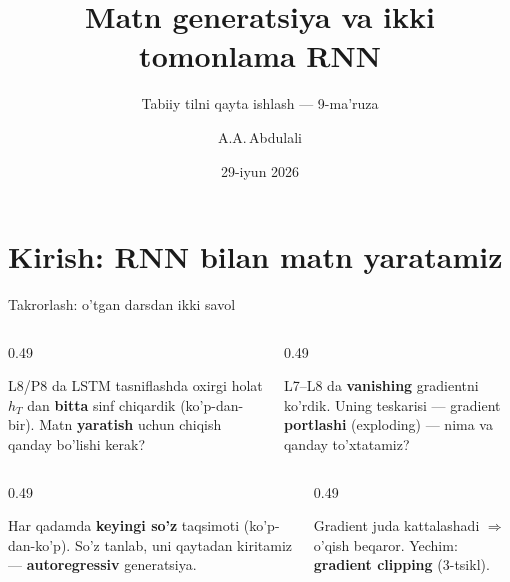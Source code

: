 \documentclass[aspectratio=169,11pt]{beamer}
\title[Generatsiya va Bi-RNN]{Matn generatsiya va ikki tomonlama RNN}
\subtitle{Tabiiy tilni qayta ishlash --- 9-ma'ruza}
\author[A.A.\,Abdulali]{A.A.\,Abdulali}
\date{29-iyun 2026}
\institute{11:00--12:20 \quad$\cdot$\quad mavzu \textnumero{}9}
\begin{document}

\maketitle

\section[Kirish]{Kirish: RNN bilan matn yaratamiz}

\begin{frame}{Takrorlash: o'tgan darsdan ikki savol}
  \begin{columns}[T]
    \begin{column}{0.49\textwidth}
      \begin{tcolorbox}[warnbox,title=1-savol]
        \small
        L8/P8 da LSTM tasniflashda oxirgi holat $h_T$ dan \textbf{bitta} sinf chiqardik
        (ko'p-dan-bir). Matn \textbf{yaratish} uchun chiqish qanday bo'lishi kerak?
      \end{tcolorbox}
    \end{column}
    \begin{column}{0.49\textwidth}
      \begin{tcolorbox}[warnbox,title=2-savol]
        \small
        L7--L8 da \textbf{vanishing} gradientni ko'rdik. Uning teskarisi ---
        gradient \textbf{portlashi} (exploding) --- nima va qanday to'xtatamiz?
      \end{tcolorbox}
    \end{column}
  \end{columns}
  \pause
  \vspace{4pt}
  \begin{columns}[T]
    \begin{column}{0.49\textwidth}
      \begin{tcolorbox}[okbox,title=1-javob]
        \small
        Har qadamda \textbf{keyingi so'z} taqsimoti (ko'p-dan-ko'p). So'z tanlab,
        uni qaytadan kiritamiz --- \textbf{autoregressiv} generatsiya.
      \end{tcolorbox}
    \end{column}
    \begin{column}{0.49\textwidth}
      \begin{tcolorbox}[okbox,title=2-javob]
        \small
        Gradient juda kattalashadi $\Rightarrow$ o'qish beqaror. Yechim:
        \textbf{gradient clipping} (3-tsikl).
      \end{tcolorbox}
    \end{column}
  \end{columns}
\end{frame}
\end{document}

